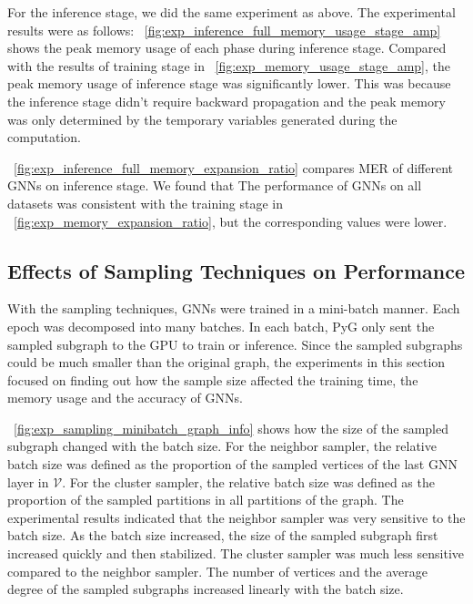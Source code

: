For the inference stage, we did the same experiment as above. The experimental results were as follows:
%
\figurename~\ref{fig:exp_inference_full_memory_usage_stage_amp} shows the peak memory usage of each phase during inference stage.  
%
Compared with the results of training stage in \figurename~\ref{fig:exp_memory_usage_stage_amp}, the peak memory usage of inference stage was significantly lower.
%
This was because the inference stage didn't require backward propagation and the peak memory was only determined by the temporary variables generated during the computation.
%

\figurename~\ref{fig:exp_inference_full_memory_expansion_ratio} compares MER of different GNNs on inference stage. 
%
We found that The performance of GNNs on all datasets was consistent with the training stage in \figurename~\ref{fig:exp_memory_expansion_ratio}, but the corresponding values were lower.
%

%

\subsection{Effects of Sampling Techniques on Performance}
\label{sec:effects_of_sampling_techniques_on_performance}

With the sampling techniques, GNNs were trained in a mini-batch manner.
%
Each epoch was decomposed into many batches.
%
In each batch, PyG only sent the sampled subgraph to the GPU to train or inference.
%
Since the sampled subgraphs could be much smaller than the original graph, the experiments in this section focused on finding out how the sample size affected the training time, the memory usage and the accuracy of GNNs.

\figurename~\ref{fig:exp_sampling_minibatch_graph_info} shows how the size of the sampled subgraph changed with the batch size.
%
For the neighbor sampler, the relative batch size was defined as the proportion of the sampled vertices of the last GNN layer in $\mathcal{V}$.
%
For the cluster sampler, the relative batch size was defined as the proportion of the sampled partitions in all partitions of the graph.
%
The experimental results indicated that the neighbor sampler was very sensitive to the batch size.
%
As the batch size increased, the size of the sampled subgraph first increased quickly and then stabilized.
%
The cluster sampler was much less sensitive compared to the neighbor sampler.
%
The number of vertices and the average degree of the sampled subgraphs increased linearly with the batch size.

